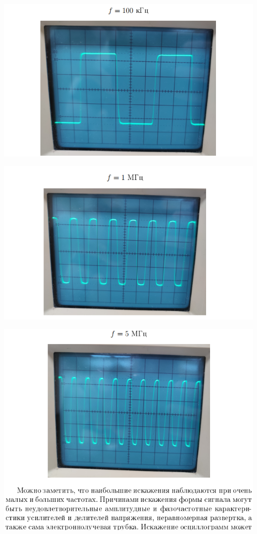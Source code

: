 \documentclass[a4paper,12pt]{article} %
\begin{document}
\begin{center}
\includegraphics{16}
\end{center}

\begin{center}
\includegraphics{17}
\end{center}

\begin{center}
\includegraphics{18}
\end{center}
\end{document}
